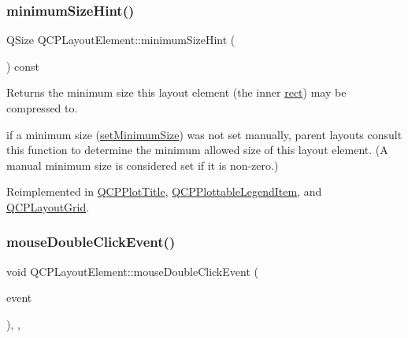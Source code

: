 \hypertarget{class_q_c_p_layout_element_ab3fdb5c9a5189bb2dac10d4d25329cd8}{}\label{class_q_c_p_layout_element_ab3fdb5c9a5189bb2dac10d4d25329cd8} 
\subsubsection{\texorpdfstring{minimum\+Size\+Hint()}{minimumSizeHint()}}
{\footnotesize\ttfamily Q\+Size Q\+C\+P\+Layout\+Element\+::minimum\+Size\+Hint (\begin{DoxyParamCaption}{ }\end{DoxyParamCaption}) const\hspace{0.3cm}{\ttfamily [virtual]}}

Returns the minimum size this layout element (the inner \hyperlink{class_q_c_p_layout_element_a208effccfe2cca4a0eaf9393e60f2dd4}{rect}) may be compressed to.

if a minimum size (\hyperlink{class_q_c_p_layout_element_a5dd29a3c8bc88440c97c06b67be7886b}{set\+Minimum\+Size}) was not set manually, parent layouts consult this function to determine the minimum allowed size of this layout element. (A manual minimum size is considered set if it is non-\/zero.) 

Reimplemented in \hyperlink{class_q_c_p_plot_title_aeed5454134516655723bf2d0499dea24}{Q\+C\+P\+Plot\+Title}, \hyperlink{class_q_c_p_plottable_legend_item_a3adf8154c7e61538656d80464e5695dd}{Q\+C\+P\+Plottable\+Legend\+Item}, and \hyperlink{class_q_c_p_layout_grid_a9ef4b0d626708a1ada2cfea3a5973b80}{Q\+C\+P\+Layout\+Grid}.

\hypertarget{class_q_c_p_layout_element_aa8fef6486cb6ceb7c82cbdd50bc32ee9}{}\label{class_q_c_p_layout_element_aa8fef6486cb6ceb7c82cbdd50bc32ee9} 
\subsubsection{\texorpdfstring{mouse\+Double\+Click\+Event()}{mouseDoubleClickEvent()}}
{\footnotesize\ttfamily void Q\+C\+P\+Layout\+Element\+::mouse\+Double\+Click\+Event (\begin{DoxyParamCaption}\item[{Q\+Mouse\+Event $\ast$}]{event }\end{DoxyParamCaption})\hspace{0.3cm}{\ttfamily [inline]}, {\ttfamily [protected]}, {\ttfamily [virtual]}}

